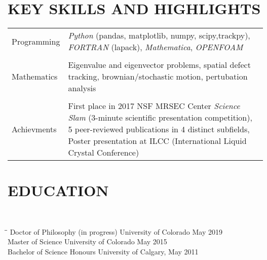 \documentclass{res}
\begin{document}
 


\address{Boulder, CO 80302\\(720) 278
5986\\adamasgreen.com\\linkedin: www.linkedin.com/in/adamasgreen \qquad adam.aagen.green@gmail.com}
                                  
\begin{resume}

\section{KEY SKILLS AND HIGHLIGHTS}          
\noindent \begin{tabular}{@{}l p{}}\\
        Programming& \textit{Python} (pandas, matplotlib, numpy,
        scipy,trackpy), \textit{FORTRAN} (lapack), \textit{Mathematica},
    \textit{OPENFOAM}\\ \\
            Mathematics & Eigenvalue and eigenvector problems, spatial defect
            tracking, brownian/stochastic motion, pertubation
            analysis\\\\
            Achievments & First place in 2017 NSF MRSEC Center \textit{Science Slam}
    (3-minute scientific presentation competition), 5 peer-reviewed publications
    in 4 distinct subfields, Poster presentation at ILCC (International Liquid Crystal
    Conference)\\
\end{tabular}


\section{EDUCATION}          \\
\begin{tabbing}
    \hspace{2.3in}\=\hspace{2.6in}\=\kill
Doctor of Philosophy (in progress) \> University of Colorado \>May 2019  \\        
    Master of Science \> University of Colorado\> May 2015  \\        
    Bachelor of Science Honours \>University of Calgary, \>May 2011   \\       
\end{tabbing}


\end{resume}
\end{document}
